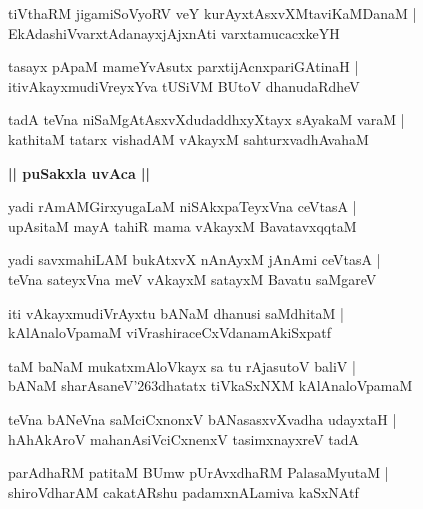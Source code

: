 \documentclass[twoside,12pt,openright]{book}
\def\S{\char'263}
\newcounter{shloka}[chapter]
\def\uvaca#1{\centerline{{\large\textbf{#1}}}}
\begin{document}
\begin{shloka}%
tiVthaRM jigamiSoVyoRV veY kurAyxtAsxvXMtaviKaMDanaM |\\
EkAdashiVvarxtAdanayxjAjxnAti varxtamucacxkeYH
\end{shloka}

\begin{shloka}%
tasayx pApaM mameYvAsutx parxtijAcnxpariGAtinaH |\\
itivAkayxmudiVreyxYva tUSiVM BUtoV dhanudaRdheV
\end{shloka}

\begin{shloka}%
tadA teVna niSaMgAtAsxvXdudaddhxyXtayx sAyakaM varaM |\\
kathitaM tatarx vishadAM vAkayxM sahturxvadhAvahaM 
\end{shloka}

\uvaca{|| puSakxla uvAca ||}

\begin{shloka}%
yadi rAmAMGirxyugaLaM niSAkxpaTeyxVna ceVtasA |\\
upAsitaM mayA tahiR mama vAkayxM BavatavxqqtaM 
\end{shloka}

\begin{shloka}%
yadi savxmahiLAM bukAtxvX nAnAyxM jAnAmi ceVtasA |\\
teVna sateyxVna meV vAkayxM satayxM  Bavatu saMgareV 
\end{shloka}

\begin{shloka}%
iti vAkayxmudiVrAyxtu bANaM dhanusi saMdhitaM |\\
kAlAnaloVpamaM viVrashiraceCxVdanamAkiSxpatf 
\end{shloka}

\begin{shloka}%
taM baNaM mukatxmAloVkayx sa tu rAjasutoV baliV |\\
bANaM sharAsaneV\S dhatatx tiVkaSxNXM kAlAnaloVpamaM 
\end{shloka}

\begin{shloka}%
teVna bANeVna saMciCxnonxV bANasasxvXvadha udayxtaH |\\
hAhAkAroV mahanAsiVciCxnenxV tasimxnayxreV tadA 
\end{shloka}

\begin{shloka}%
parAdhaRM patitaM BUmw pUrAvxdhaRM PalasaMyutaM |\\
shiroVdharAM cakatARshu padamxnALamiva kaSxNAtf 
\end{shloka}
\end{document}
